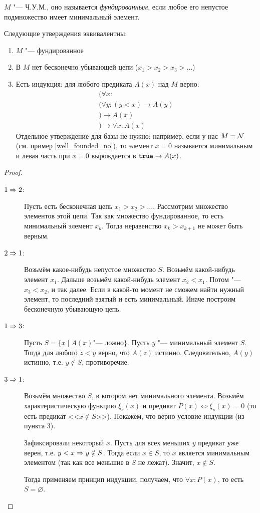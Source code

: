\begin{Def}
	$M$ "--- Ч.У.М., оно называется \textit{фундированным}, если любое его непустое подмножество
	имеет минимальный элемент.
\end{Def}
\begin{theorem}
	Следующие утверждения эквивалентны:
	\begin{enumerate}
		\item $M$ "--- фундированное
		\item В $M$ нет бесконечно убывающей цепи ($x_1 > x_2 > x_3 > \dots$)
		\item
			Есть индукция: для любого предиката $A(x)$ над $M$ верно:
			\begin{gather*}
				(\forall x \colon\\
					(\forall y\colon (y < x) \to A(y) \\
					) \to A(x) \\
				) \to \forall x \colon A(x)
			\end{gather*}
			Отдельное утверждение для базы не нужно: например, если у нас $M=\mathcal{N}$ (см. пример \ref{well_founded_no}),
			то элемент $x=0$ называется минимальным и левая часть при $x=0$ вырождается в $\texttt{true} \to A(x)$.
	\end{enumerate}
\end{theorem}
\begin{proof}
	\begin{description}
		\item[$1 \Rightarrow 2$:]
			Пусть есть бесконечная цепь $x_1 > x_2 > \dots$.
			Рассмотрим множество элементов этой цепи.
			Так как множество фундированное, то есть минимальный элемент $x_k$.
			Тогда неравенство $x_k > x_{k+1}$ не может быть верным.

		\item[$2 \Rightarrow 1$:]
			Возьмём какое-нибудь непустое множество $S$.
			Возьмём какой-нибудь элемент $x_1$.
			Дальше возьмём какой-нибудь элемент $x_2 < x_1$.
			Потом "--- $x_3 < x_2$, и так далее.
			Если в какой-то момент не сможем найти нужный элемент, то последний взятый и есть минимальный.
			Иначе построим бесконечную убывающую цепь.

		\item[$1 \Rightarrow 3$:]
			Пусть $S=\{x \mid A(x) \text{"--- ложно}\}$.
			Пусть $y$ "--- минимальный элемент $S$.
			Тогда для любого $z<y$ верно, что $A(z)$ истинно.
			Следовательно, $A(y)$ истинно, т.е. $y \notin S$, противоречие.

		\item[$3 \Rightarrow 1$:]
			Возьмём множество $S$, в котором нет минимального элемента.
			Возьмём характеристическую функцию $\xi_s(x)$ и предикат $P(x) \iff \xi_s(x)=0$
			(то есть предикат <<$x \notin S$>>).
			Покажем, что верно условие индукции (из пункта 3).

			Зафиксировали некоторый $x$.
			Пусть для всех меньших $y$ предикат уже верен, т.е. $y < x \Rightarrow y \notin S$.
			Тогда если $x \in S$, то $x$ является минимальным элементом (так как все меньшие в $S$ не лежат).
			Значит, $x \notin S$.

			Тогда применяем принцип индукции, получаем, что $\forall x \colon P(x)$,
			то есть $S = \varnothing$.
	\end{description}
\end{proof}

